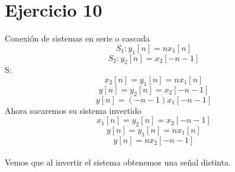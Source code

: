 \documentclass[10pt,a4paper]{report}
\begin{document}
\section{Ejercicio 10}

Conexión de sistemas en serie o cascada\\
\[ S_{1}: y_{1}\left[n\right] = nx_{1}\left[n\right] \]
\[ S_{2}: y_{2}\left[n\right] = x_{2}\left[-n-1\right] \]
S:
\[ x_{2}\left[n \right] = y_{1}\left[n\right] = nx_{1}\left[n\right] \]
\[ y\left[n\right] = y_{2}\left[n\right] = x_{2}\left[-n-1\right] \]
\[ y\left[n\right] = \left(-n-1\right)x_{1}\left[-n-1\right] \]
Ahora sacaremos su sistema invertido\\
\[ x_{1}\left[n\right] = y_{2}\left[n\right]=x_{2}\left[-n-1\right] \]
\[ y\left[n\right] = y_{1}\left[n\right] = nx_{1}\left[n\right] \]
\[ y\left[n\right] = nx_{2}\left[-n-1\right] \]\\
Vemos que al invertir el sistema obtenemos una señal distinta.
\end{document}
